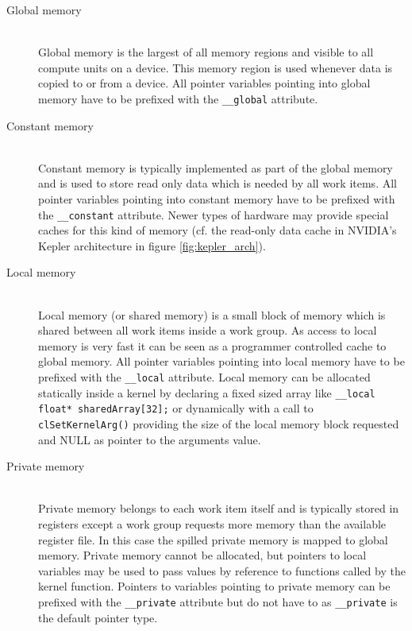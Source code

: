 \begin{description}
	\item[Global memory] \hfill \\
	Global memory is the largest of all memory regions and visible to all compute units on a device. This memory region is used whenever data is copied to or from a device. All pointer variables pointing into global memory have to be prefixed with the \lstinline!__global! attribute. \cite[p.29]{opencl_book}
	
	\item[Constant memory] \hfill \\
	Constant memory is typically implemented as part of the global memory and is used to store read only data which is needed by all work items. All pointer variables pointing into constant memory have to be prefixed with the \lstinline!__constant! attribute. \cite[p.30]{opencl_book} Newer types of hardware may provide special caches for this kind of memory (cf. the read-only data cache in NVIDIA's Kepler architecture in figure \ref{fig:kepler_arch}). \cite[p.30]{opencl_book}
	
	\item[Local memory] \hfill \\
	Local memory (or shared memory) is a small block of memory which is shared between all work items inside a work group. As access to local memory is very fast it can be seen as a programmer controlled cache to global memory. All pointer variables pointing into local memory have to be prefixed with the \lstinline!__local! attribute. Local memory can be allocated statically inside a kernel by declaring a fixed sized array like \lstinline!__local float* sharedArray[32];! or dynamically with a call to \lstinline!clSetKernelArg()! providing the size of the local memory block requested and NULL as pointer to the arguments value. \cite[p.30]{opencl_book}
	
	\item[Private memory] \hfill \\
	Private memory belongs to each work item itself and is typically stored in registers except a work group requests more memory than the available register file. In this case the spilled private memory is mapped to global memory. Private memory cannot be allocated, but pointers to local variables may be used to pass values by reference to functions called by the kernel function. Pointers to variables pointing to private memory can be prefixed with the \lstinline!__private! attribute but do not have to as \lstinline!__private! is the default pointer type. \cite[p.30]{opencl_book}
	
\end{description}

